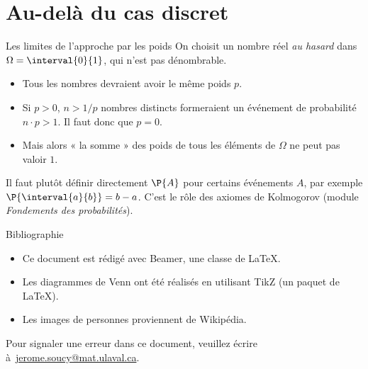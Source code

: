\documentclass[nuit,charter,pied,handout]{BeamerJS}
\begin{document}
\section{Au-delà du cas discret}
\begin{frame}[t]{Les limites de l'approche par les poids}
\pause
	On choisit un nombre réel \emph{au hasard} dans \(\Omega=\interval{0}{1}\), qui n'est pas dénombrable.
	\pause
	\begin{itemize}
		\item Tous les nombres devraient avoir le même poids \(p\).\pause
		\item Si \(p>0\), \(n>1/p\) nombres distincts formeraient un événement de probabilité \(n\cdot p>1\). \pause Il faut donc que \(p=0\).\pause
		\item Mais alors « la somme » des poids de tous les éléments de \(\Omega\) ne peut pas valoir \(1\).
	\end{itemize}
	\pause
	\begin{lumiere}
		Il faut plutôt définir directement \(\P{A}\) pour certains événements \(A\), par exemple \(\P{\interval{a}{b}}=b-a\). C'est le rôle des axiomes de Kolmogorov (module \emph{Fondements des probabilités}).
	\end{lumiere}
\end{frame}
 \begin{frame}[allowframebreaks]{Bibliographie}
 \printbibliography[heading=none]
	\vspace{0.5cm}
 \begin{rems}
 	\begin{itemize}
 		\item Ce document est rédigé avec Beamer, une classe de LaTeX.
 		\item Les diagrammes de Venn ont été réalisés en utilisant TikZ (un paquet de LaTeX).
 		\item Les images de personnes proviennent de Wikipédia.
 	\end{itemize}
 \end{rems}
 	\vfill
 	\footnotesize Pour signaler une erreur dans ce document, veuillez écrire à~\href{mailto:jerome.soucy@mat.ulaval.ca}{jerome.soucy@mat.ulaval.ca}.
 \end{frame}
\end{document}
